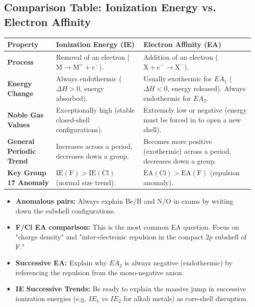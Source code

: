 \documentclass[12pt,a4paper]{article}
\begin{document}
\subsection{Comparison Table: Ionization Energy vs. Electron Affinity}
\par\noindent
\begin{tabularx}{\linewidth}{|B{4.5cm}|Y|Y|}
\hline
\textbf{Property} & \textbf{Ionization Energy (IE)} & \textbf{Electron Affinity (EA)} \\
\hline
\textbf{Process} & Removal of an electron ($\text{M} \to \text{M}^+ + e^-$). & Addition of an electron ($\text{X} + e^- \to \text{X}^-$). \\
\hline
\textbf{Energy Change} & Always endothermic ($\Delta H > 0$, energy absorbed). & Usually exothermic for $EA_1$ ($\Delta H < 0$, energy released). Always endothermic for $EA_2$. \\
\hline
\textbf{Noble Gas Values} & Exceptionally high (stable closed-shell configurations). & Extremely low or negative (energy must be forced in to open a new shell). \\
\hline
\textbf{General Periodic Trend} & Increases across a period, decreases down a group. & Becomes more positive (exothermic) across a period, decreases down a group. \\
\hline
\textbf{Key Group 17 Anomaly} & $\text{IE}(\text{F}) > \text{IE}(\text{Cl})$ (normal size trend). & $\text{EA}(\text{Cl}) > \text{EA}(\text{F})$ (repulsion anomaly). \\
\hline
\end{tabularx}
\vspace{6pt}

\begin{tcolorbox}[exambox, title={Exam Points: IE and EA}]
  \begin{itemize}[leftmargin=*, itemsep=2pt, topsep=2pt]
    \item \textbf{Anomalous pairs:} Always explain Be/B and N/O in exams by writing down the subshell configurations.
    \item \textbf{F/Cl EA comparison:} This is the most common EA question. Focus on "charge density" and "inter-electronic repulsion in the compact $2p$ subshell of F."
    \item \textbf{Successive EA:} Explain why $EA_2$ is always negative (endothermic) by referencing the repulsion from the mono-negative anion.
    \item \textbf{IE Successive Trends:} Be ready to explain the massive jump in successive ionization energies (e.g. $IE_1$ vs $IE_2$ for alkali metals) as core-shell disruption.
  \end{itemize}
\end{tcolorbox}
\end{document}

